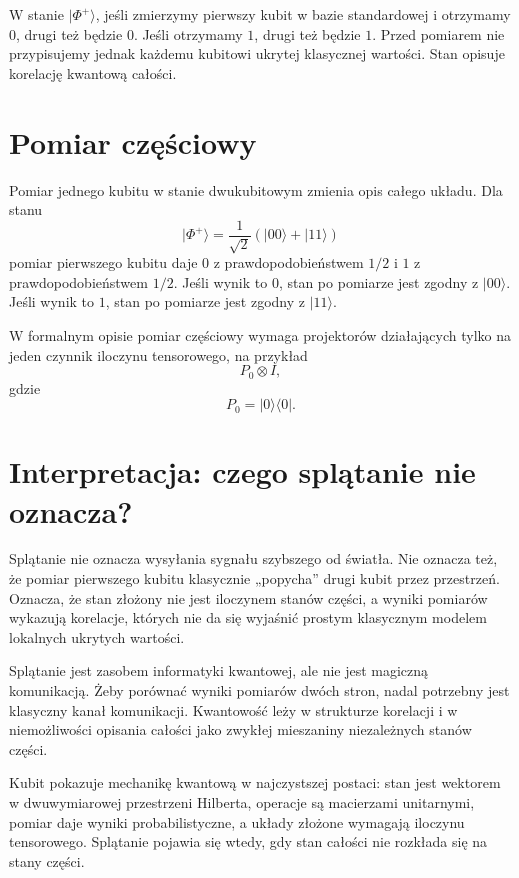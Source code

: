 W stanie \(|\Phi^+\rangle\), jeśli zmierzymy pierwszy kubit w bazie standardowej i otrzymamy \(0\), drugi też będzie \(0\). Jeśli otrzymamy \(1\), drugi też będzie \(1\). Przed pomiarem nie przypisujemy jednak każdemu kubitowi ukrytej klasycznej wartości. Stan opisuje korelację kwantową całości.

\section{Pomiar częściowy}

Pomiar jednego kubitu w stanie dwukubitowym zmienia opis całego układu. Dla stanu
\begin{equation}
    |\Phi^+\rangle=\frac{1}{\sqrt{2}}(|00\rangle+|11\rangle)
\end{equation}
pomiar pierwszego kubitu daje \(0\) z prawdopodobieństwem \(1/2\) i \(1\) z prawdopodobieństwem \(1/2\). Jeśli wynik to \(0\), stan po pomiarze jest zgodny z \(|00\rangle\). Jeśli wynik to \(1\), stan po pomiarze jest zgodny z \(|11\rangle\).

W formalnym opisie pomiar częściowy wymaga projektorów działających tylko na jeden czynnik iloczynu tensorowego, na przykład
\begin{equation}
    P_0\otimes I,
\end{equation}
gdzie
\begin{equation}
    P_0=|0\rangle\langle0|.
\end{equation}

\section{Interpretacja: czego splątanie nie oznacza?}

Splątanie nie oznacza wysyłania sygnału szybszego od światła. Nie oznacza też, że pomiar pierwszego kubitu klasycznie „popycha” drugi kubit przez przestrzeń. Oznacza, że stan złożony nie jest iloczynem stanów części, a wyniki pomiarów wykazują korelacje, których nie da się wyjaśnić prostym klasycznym modelem lokalnych ukrytych wartości.

Splątanie jest zasobem informatyki kwantowej, ale nie jest magiczną komunikacją. Żeby porównać wyniki pomiarów dwóch stron, nadal potrzebny jest klasyczny kanał komunikacji. Kwantowość leży w strukturze korelacji i w niemożliwości opisania całości jako zwykłej mieszaniny niezależnych stanów części.

\begin{summarybox}
Kubit pokazuje mechanikę kwantową w najczystszej postaci: stan jest wektorem w dwuwymiarowej przestrzeni Hilberta, operacje są macierzami unitarnymi, pomiar daje wyniki probabilistyczne, a układy złożone wymagają iloczynu tensorowego. Splątanie pojawia się wtedy, gdy stan całości nie rozkłada się na stany części.
\end{summarybox}
